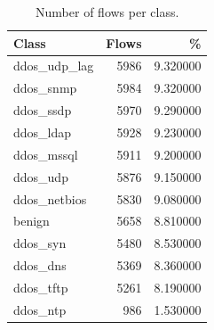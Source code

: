 \begin{table}[htbp]
\centering
\caption{Number of flows per class.}
\label{tab:flows_per_class}
\begin{tabular}{lrr}
\toprule
Class & Flows & \% \\
\midrule
ddos\_udp\_lag & 5986 & 9.320000 \\
ddos\_snmp & 5984 & 9.320000 \\
ddos\_ssdp & 5970 & 9.290000 \\
ddos\_ldap & 5928 & 9.230000 \\
ddos\_mssql & 5911 & 9.200000 \\
ddos\_udp & 5876 & 9.150000 \\
ddos\_netbios & 5830 & 9.080000 \\
benign & 5658 & 8.810000 \\
ddos\_syn & 5480 & 8.530000 \\
ddos\_dns & 5369 & 8.360000 \\
ddos\_tftp & 5261 & 8.190000 \\
ddos\_ntp & 986 & 1.530000 \\
\bottomrule
\end{tabular}
\end{table}
